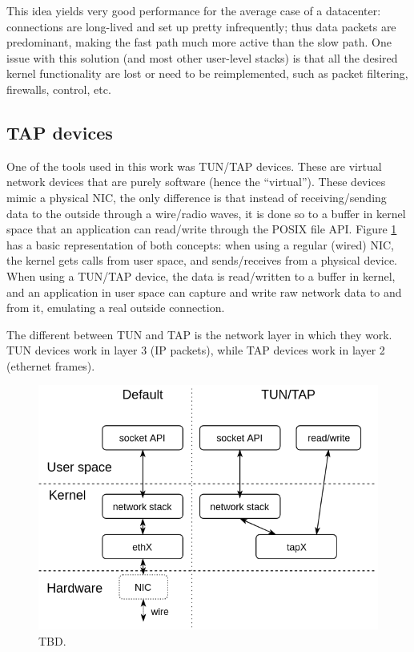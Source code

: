 This idea yields very good performance for the average case of a datacenter: connections are long-lived and set up
pretty infrequently; thus data packets are predominant, making the fast path much more active than the slow path. One 
issue with this solution (and most other user-level stacks) is that all the desired kernel functionality are lost or
need to be reimplemented, such as
packet filtering, firewalls, control, etc.

%
%

\subsection{TAP devices}

One of the tools used in this work was TUN/TAP devices. These are virtual network devices that are purely software 
(hence the ``virtual''). These devices mimic a physical NIC, the only difference is that instead of receiving/sending
data to the outside through a wire/radio waves, it is done so to a buffer in kernel space that an application can read/write
through the POSIX file API. Figure \ref{fig:tap} has a basic representation of both concepts: when using a regular (wired)
NIC, the kernel gets calls from user space, and sends/receives from a physical device. When using a TUN/TAP device, the data is
read/written to a buffer in kernel, and an application in user space can capture and write raw network data to and from it, 
emulating a real outside connection.

The different between TUN and TAP is the network layer in which they work. TUN devices work in layer 3 (IP packets), while TAP
devices work in layer 2 (ethernet frames).


\begin{figure}
\centering
\includegraphics[width=0.7\columnwidth]{figures/tap_diag.png}
\caption{TBD.}
\label{fig:tap}
\end{figure}
